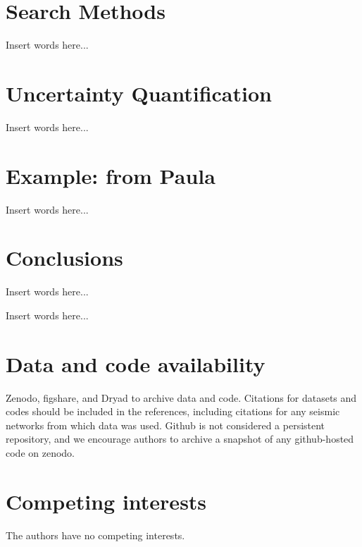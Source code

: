 \documentclass[preprint]{seismica}
\begin{document}
\section{Search Methods} \label{sec:algorithms}

    Insert words here...

\section{Uncertainty Quantification} \label{sec:uncertainty}

    Insert words here...

\section{Example: from Paula} \label{sec:example}

    Insert words here...

\section{Conclusions} \label{sec:conclusion}

    Insert words here...

\begin{acknowledgements}
    [Suzan] Insert words here...
\end{acknowledgements}

\section*{Data and code availability}
Zenodo, figshare, and Dryad to archive data and code. Citations for datasets and codes should be
included in the references, including citations for any seismic networks from which data was used.
Github is not considered a persistent repository, and we encourage authors to archive a snapshot of
any github-hosted code on zenodo.

\section*{Competing interests}
    The authors have no competing interests.


   
\end{document}
